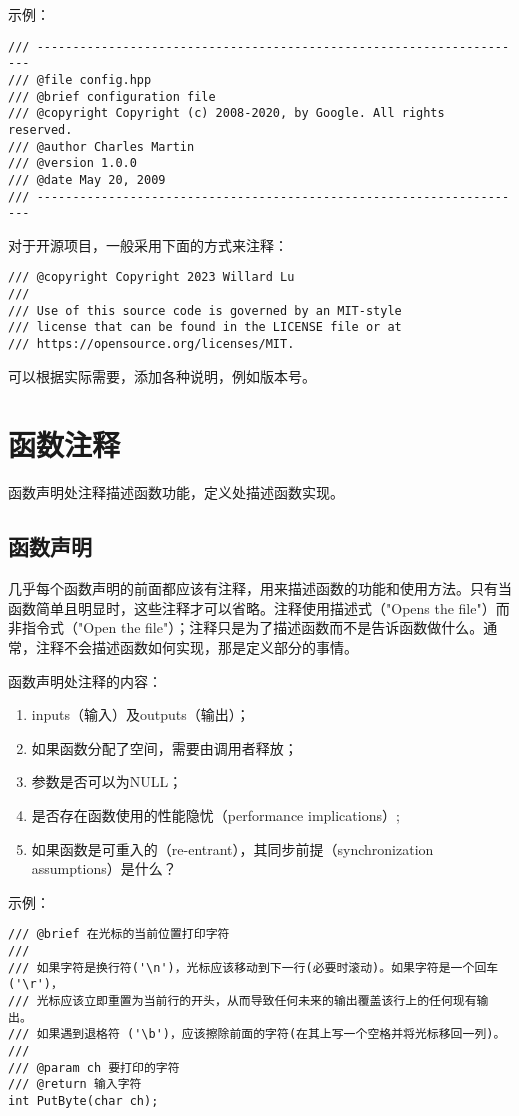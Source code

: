 示例：
\begin{verbatim}
/// ---------------------------------------------------------------------
/// @file config.hpp
/// @brief configuration file
/// @copyright Copyright (c) 2008-2020, by Google. All rights reserved.
/// @author Charles Martin
/// @version 1.0.0
/// @date May 20, 2009
/// ---------------------------------------------------------------------
\end{verbatim}

对于开源项目，一般采用下面的方式来注释：
\begin{verbatim}
/// @copyright Copyright 2023 Willard Lu
///
/// Use of this source code is governed by an MIT-style
/// license that can be found in the LICENSE file or at
/// https://opensource.org/licenses/MIT.
\end{verbatim}
可以根据实际需要，添加各种说明，例如版本号。


\section{函数注释}
函数声明处注释描述函数功能，定义处描述函数实现。

\subsection{函数声明}
几乎每个函数声明的前面都应该有注释，用来描述函数的功能和使用方法。只有当函数简单且明显时，这些注释才可以省略。注释使用描述式（"Opens the file"）而非指令式（"Open the file"）；注释只是为了描述函数而不是告诉函数做什么。通常，注释不会描述函数如何实现，那是定义部分的事情。

函数声明处注释的内容：
\begin{enumerate}[1）]
\item inputs（输入）及outputs（输出）；
\item 如果函数分配了空间，需要由调用者释放；
\item 参数是否可以为NULL；
\item 是否存在函数使用的性能隐忧（performance implications）;
\item 如果函数是可重入的（re-entrant），其同步前提（synchronization assumptions）是什么？
\end{enumerate}

示例：
\begin{verbatim}
/// @brief 在光标的当前位置打印字符
///
/// 如果字符是换行符('\n')，光标应该移动到下一行(必要时滚动)。如果字符是一个回车('\r')，
/// 光标应该立即重置为当前行的开头，从而导致任何未来的输出覆盖该行上的任何现有输出。
/// 如果遇到退格符 ('\b')，应该擦除前面的字符(在其上写一个空格并将光标移回一列)。
///
/// @param ch 要打印的字符
/// @return 输入字符
int PutByte(char ch);
\end{verbatim}

